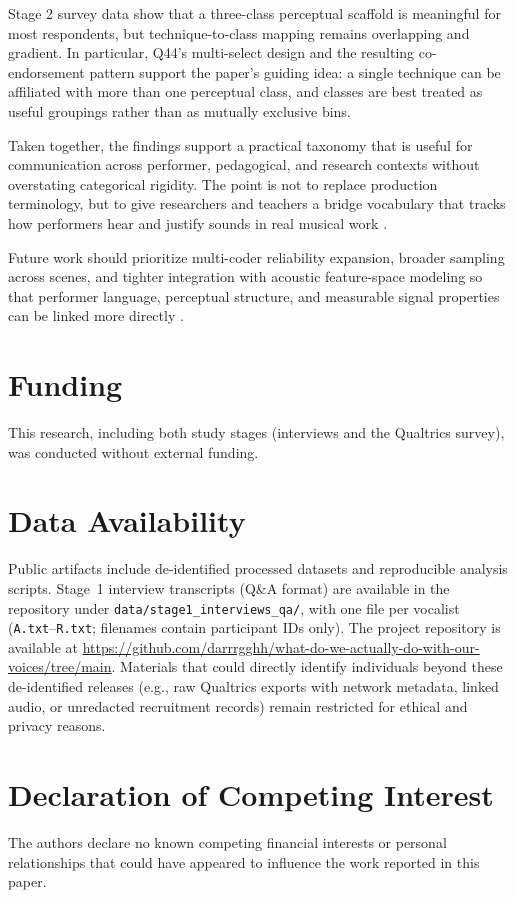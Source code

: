 \documentclass{article}
\begin{document}
Stage 2 survey data show that a three-class perceptual scaffold is meaningful for most respondents, but technique-to-class mapping remains overlapping and gradient.
In particular, Q44's multi-select design and the resulting co-endorsement pattern support the paper's guiding idea: a single technique can be affiliated with more than one perceptual class, and classes are best treated as useful groupings rather than as mutually exclusive bins.

Taken together, the findings support a practical taxonomy that is useful for communication across performer, pedagogical, and research contexts without overstating categorical rigidity.
The point is not to replace production terminology, but to give researchers and teachers a bridge vocabulary that tracks how performers hear and justify sounds in real musical work \parencite{Ribaldini2019Terminology,sadolin2012effects}.

Future work should prioritize multi-coder reliability expansion, broader sampling across scenes, and tighter integration with acoustic feature-space modeling so that performer language, perceptual structure, and measurable signal properties can be linked more directly \parencite{Tailleur2021AcousticSpace,tailleur2024emvddatasetdatasetextreme,Lee2025VocalDistortion,Pinto2023VocalEffects}.

\section*{Funding}
This research, including both study stages (interviews and the Qualtrics survey), was conducted without external funding.

\section*{Data Availability}
Public artifacts include de-identified processed datasets and reproducible analysis scripts.
Stage~1 interview transcripts (Q\&A format) are available in the repository under \texttt{data/stage1\_interviews\_qa/}, with one file per vocalist (\texttt{A.txt}--\texttt{R.txt}; filenames contain participant IDs only).
The project repository is available at \url{https://github.com/darrrgghh/what-do-we-actually-do-with-our-voices/tree/main}.
Materials that could directly identify individuals beyond these de-identified releases (e.g., raw Qualtrics exports with network metadata, linked audio, or unredacted recruitment records) remain restricted for ethical and privacy reasons.

\section*{Declaration of Competing Interest}
The authors declare no known competing financial interests or personal relationships that could have appeared to influence the work reported in this paper.



\printbibliography
\end{document}
